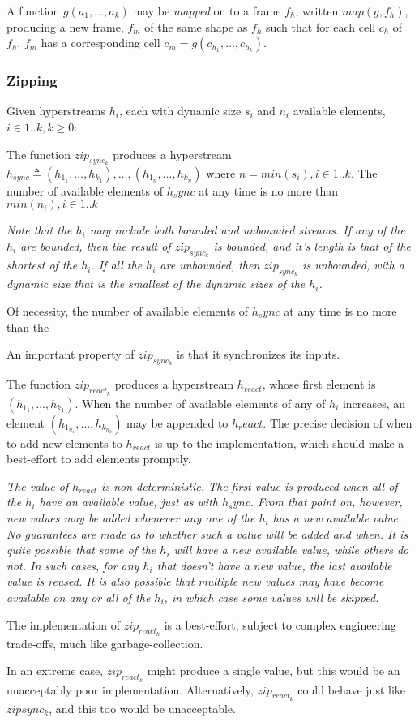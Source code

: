 \documentclass{article}
\begin{document}
A function $g(a_1, \ldots, a_k)$ may be {\em mapped} on to a frame $f_h$, written $map(g, f_h)$, producing a new frame, $f_m$ of the same shape as $f_h$ such that for each cell $c_h$ of $f_h$, $f_m$ has a corresponding cell $c_m = g(c_{h_1}, \ldots, c_{h_k})$.

\subsubsection{Zipping}
\label{zipping}

Given hyperstreams $h_i$, each with dynamic size $s_i$ and $n_i$  available elements, $ i \in 1..k, k \ge 0$:

 The function $zip_{sync_k}$ produces a hyperstream $h_{sync} \triangleq (h_{1_1}, \ldots, h_{k_1}), \ldots, (h_{1_n}, \ldots, h_{k_n})$ where $n = min(s_i), i \in 1..k$.
 The number of available elements of $h_sync$ at any time is no more than $min(n_i), i \in 1..k$

{\em
Note that the $h_i$ may include both bounded and unbounded streams. If any of the $h_i$ are bounded, then the result of $zip_{sync_k}$ is bounded, and it's length is that of the shortest of the $h_i$. If all  the $h_i$ are unbounded, then $zip_{sync_k}$ is unbounded, with a dynamic size that is the smallest of the dynamic sizes of the $h_i$.

Of necessity, the number of available elements of $h_sync$ at any time is no more than the

An important property of $zip_{sync_k}$ is that it synchronizes its inputs.
}

The function $zip_{react_k}$  produces a hyperstream $h_{react}$, whose first element is $(h_{1_1}, \ldots, h_{k_1})$. When the number of available elements of any of $h_i$ increases, an element $(h_{1_{n_1}}, \ldots, h_{k_{n_k}})$ may be appended to $h_react$. The precise decision of when to add new elements to $h_{react}$ is up to the
implementation, which should make a best-effort to add elements promptly.

{\em
The value of $h_{react}$ is non-deterministic. The first value is produced when all of the $h_i$ have an available value, just as with $h_sync$. From that point on, however,
new values may be added whenever any one of the $h_i$ has a new available value. No guarantees are made as to whether such a value will be added and when. It is quite possible that some of the $h_i$ will have a new available value, while others do not. In such cases, for any $h_i$ that doesn't have a new value,  the last available value is reused.
It is also possible that multiple new values may have become available on any or all of the $h_i$, in which case some values will be skipped.

The implementation of $zip_{react_k}$ is a best-effort, subject to complex engineering trade-offs, much like garbage-collection.

In an extreme case, $zip_{react_k}$ might produce a single value, but this would be an unacceptably poor implementation. Alternatively, $zip_{react_k}$ could behave just like 
$zip{sync_k}$, and this too would be unacceptable.
}
\end{document}
